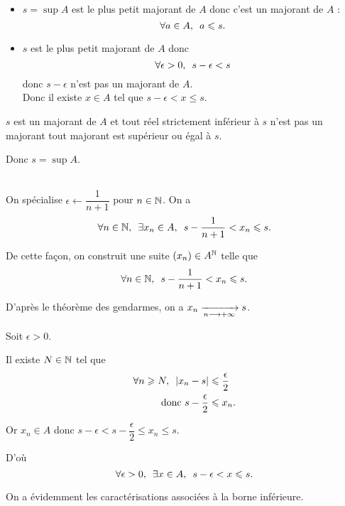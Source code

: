 \begin{dem}[\(\paren{\alpha}\imp\paren{\beta}\)]
\begin{itemize}
    \item \(s=\sup A\) est le plus petit majorant de \(A\) donc c'est un majorant de \(A\) : \[\quantifs{\forall a\in A}a\leq s.\]
    \item \(s\) est le plus petit majorant de \(A\) donc \[\quantifs{\forall\epsilon>0}s-\epsilon<s\] donc \(s-\epsilon\) n'est pas un majorant de \(A\). \\ Donc il existe \(x\in A\) tel que \(s-\epsilon<x\leq s\).
\end{itemize}
\end{dem}

\begin{dem}[\(\paren{\beta}\imp\paren{\alpha}\)]
\(s\) est un majorant de \(A\) et tout réel strictement inférieur à \(s\) n'est pas un majorant \ie tout majorant est supérieur ou égal à \(s\).

Donc \(s=\sup A\).
\end{dem}

\begin{dem}[\(\paren{\beta}\imp\paren{\gamma}\)]~\\
On spécialise \(\epsilon\gets\dfrac{1}{n+1}\) pour \(n\in\mathbb{N}\). On a \[\quantifs{\forall n\in\N;\exists x_n\in A}s-\dfrac{1}{n+1}<x_n\leq s.\]

De cette façon, on construit une suite \(\left(x_n\right)\in A^{\mathbb{N}}\) telle que \[\quantifs{\forall n\in\N}s-\dfrac{1}{n+1}<x_n\leq s.\]

D'après le théorème des gendarmes, on a \(x_n\xrightarrow[n\longrightarrow+\infty]{}s\).
\end{dem}

\begin{dem}[\(\paren{\gamma}\imp\paren{\beta}\)]
Soit \(\epsilon>0\).

Il existe \(N\in\mathbb{N}\) tel que \[\begin{aligned}
\quantifs{\forall n\geq N}\abs{x_n-s}&\leq\dfrac{\epsilon}{2} \\
\text{donc }s-\dfrac{\epsilon}{2}&\leq x_n.
\end{aligned}\]

Or \(x_n\in A\) donc \(s-\epsilon<s-\dfrac{\epsilon}{2}\leq x_n\leq s\).

D'où \[\quantifs{\forall\epsilon>0;\exists x\in A}s-\epsilon<x\leq s.\]
\end{dem}

On a évidemment les caractérisations associées à la borne inférieure.

